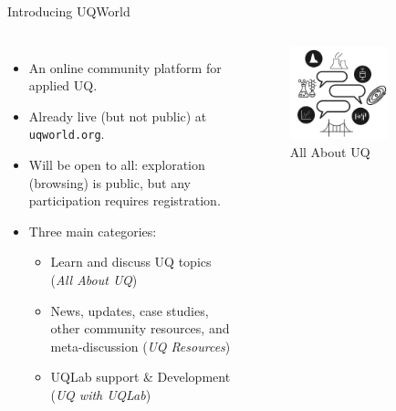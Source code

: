 \documentclass[]{rsuqbeamernew}
\begin{document}
\begin{frame}[t]{Introducing UQWorld}
\begin{columns}
    \begin{itemize}
      \item An online community platform for applied UQ.
      \item Already live (but not public) at \texttt{uqworld.org}.
      \item Will be open to all: exploration (browsing) is public,
            but any participation requires registration.
      \item Three main categories: 
      \begin{itemize}
        \item Learn and discuss UQ topics (\emph{All About UQ})
        \item News, updates, case studies, other community resources, and meta-discussion (\emph{UQ Resources})
        \item UQLab support \& Development (\emph{UQ with UQLab})
      \end{itemize}
    \end{itemize}
    \hfill
    \begin{columns}
      \begin{figure}
        \includegraphics[width=0.70\textwidth]{../figures/all-about-uq_512}
        \caption*{All About UQ}
      \end{figure}
      

\end{columns}
\end{columns}
\end{frame}
\end{document}
